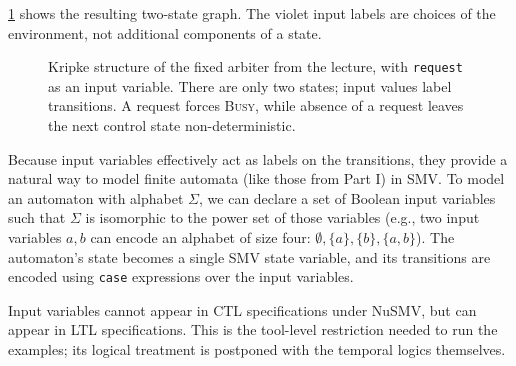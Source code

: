 \cref{fig:arbiter-ivar} shows the resulting two-state graph.  The violet input
labels are choices of the environment, not additional components of a state.

\begin{figure}[ht]
  \centering
  \caption{Kripke structure of the fixed arbiter from the lecture, with
           \texttt{request} as an input variable.  There are only two states;
           input values label transitions.  A request forces \textsc{Busy},
           while absence of a request leaves the next control state
           non-deterministic.}
  \label{fig:arbiter-ivar}
\end{figure}

\begin{remark}
Because input variables effectively act as labels on the transitions, they provide a natural way to model finite automata (like those from Part I) in SMV. To model an automaton with alphabet $\Sigma$, we can declare a set of Boolean input variables such that $\Sigma$ is isomorphic to the power set of those variables (e.g., two input variables $a, b$ can encode an alphabet of size four: $\emptyset, \{a\}, \{b\}, \{a,b\}$). The automaton's state becomes a single SMV state variable, and its transitions are encoded using \texttt{case} expressions over the input variables.
\end{remark}

\begin{remark}
Input variables cannot appear in CTL specifications under NuSMV, but can
appear in LTL specifications.  This is the tool-level restriction needed to
run the examples; its logical treatment is postponed with the temporal
logics themselves.
\end{remark}


